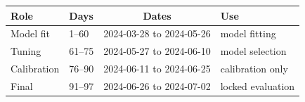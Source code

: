 \begin{tabularx}{\columnwidth}{@{}llc>{\raggedright\arraybackslash}X@{}}
\toprule
Role & Days & Dates & Use \\
\midrule
Model fit & 1--60 & 2024-03-28 to 2024-05-26 & model fitting \\
Tuning & 61--75 & 2024-05-27 to 2024-06-10 & model selection \\
Calibration & 76--90 & 2024-06-11 to 2024-06-25 & calibration only \\
Final & 91--97 & 2024-06-26 to 2024-07-02 & locked evaluation \\
\bottomrule
\end{tabularx}
